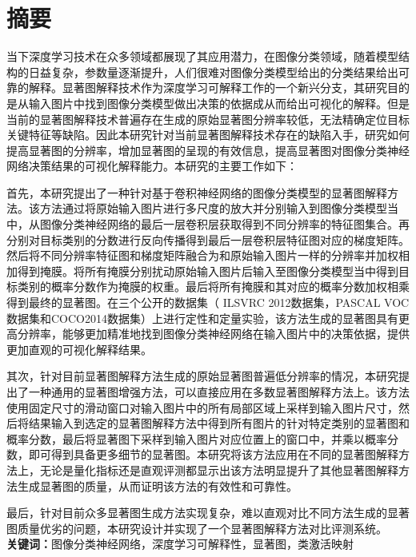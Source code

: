


\chapter{摘\quad 要}
\xiaosi

当下深度学习技术在众多领域都展现了其应用潜力，在图像分类领域，随着模型结构的日益复杂，参数量逐渐提升，人们很难对图像分类模型给出的分类结果给出可靠的解释。显著图解释技术作为深度学习可解释工作的一个新兴分支，其研究目的是从输入图片中找到图像分类模型做出决策的依据成从而给出可视化的解释。但是当前的显著图解释技术普遍存在生成的原始显著图分辨率较低，无法精确定位目标关键特征等缺陷。因此本研究针对当前显著图解释技术存在的缺陷入手，研究如何提高显著图的分辨率，增加显著图的呈现的有效信息，提高显著图对图像分类神经网络决策结果的可视化解释能力。本研究的主要工作如下：

首先，本研究提出了一种针对基于卷积神经网络的图像分类模型的显著图解释方法。该方法通过将原始输入图片进行多尺度的放大并分别输入到图像分类模型当中，从图像分类神经网络的最后一层卷积层获取得到不同分辨率的特征图集合。再分别对目标类别的分数进行反向传播得到最后一层卷积层特征图对应的梯度矩阵。然后将不同分辨率特征图和梯度矩阵融合为和原始输入图片一样的分辨率并加权相加得到掩膜。将所有掩膜分别扰动原始输入图片后输入至图像分类模型当中得到目标类别的概率分数作为掩膜的权重。最后将所有掩膜和其对应的概率分数加权相乘得到最终的显著图。在三个公开的数据集（ ILSVRC 2012数据集，PASCAL VOC数据集和COCO2014数据集）上进行定性和定量实验，该方法生成的显著图具有更高分辨率，能够更加精准地找到图像分类神经网络在输入图片中的决策依据，提供更加直观的可视化解释结果。

其次，针对目前显著图解释方法生成的原始显著图普遍低分辨率的情况，本研究提出了一种通用的显著图增强方法，可以直接应用在多数显著图解释方法上。该方法使用固定尺寸的滑动窗口对输入图片中的所有局部区域上采样到输入图片尺寸，然后将结果输入到选定的显著图解释方法中得到所有图片的针对特定类别的显著图和概率分数，最后将显著图下采样到输入图片对应位置上的窗口中，并乘以概率分数，即可得到具备更多细节的显著图。本研究将该方法应用在不同的显著图解释方法上，无论是量化指标还是直观评测都显示出该方法明显提升了其他显著图解释方法生成显著图的质量，从而证明该方法的有效性和可靠性。

最后，针对目前众多显著图生成方法实现复杂，难以直观对比不同方法生成的显著图质量优劣的问题，本研究设计并实现了一个显著图解释方法对比评测系统。
\\

\noindent\songti\textbf{关键词：}图像分类神经网络，深度学习可解释性，显著图，类激活映射

\clearpage